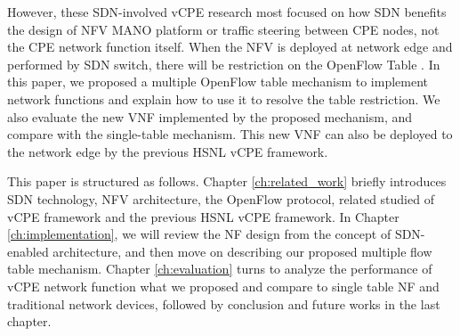 However, these SDN-involved vCPE research most focused on how SDN benefits the design of NFV MANO \cite{etsi-nfv-mano, etsi-nfv-mano-sdn} platform or traffic steering between CPE nodes, not the CPE network function itself.
When the NFV is deployed at network edge and performed by SDN switch, there will be restriction on the OpenFlow Table \cite{multiple-flow-table}.
In this paper, we proposed a multiple OpenFlow table mechanism to implement network functions and explain how to use it to resolve the table restriction.
We also evaluate the new VNF implemented by the proposed mechanism, and compare with the single-table mechanism.
This new VNF can also be deployed to the network edge by the previous HSNL vCPE framework.

This paper is structured as follows.
Chapter \ref{ch:related_work} briefly introduces SDN technology, NFV architecture, the OpenFlow protocol, related studied of vCPE framework and the previous HSNL vCPE framework.
In Chapter \ref{ch:implementation}, we will review the NF design from the concept of SDN-enabled \cite{sdn-enabled} architecture, and then move on describing our proposed multiple flow table mechanism.
Chapter \ref{ch:evaluation} turns to analyze the performance of vCPE network function what we proposed and compare to single table NF and traditional network devices, followed by conclusion and future works in the last chapter.

